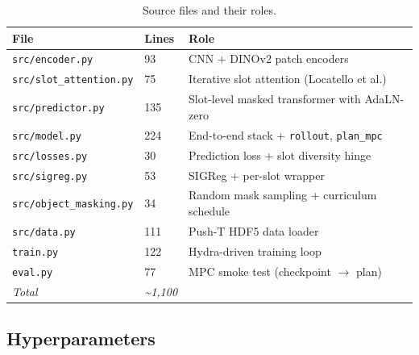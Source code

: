 \documentclass[12pt]{article}
\begin{document}
\begin{table}[h]
\centering
\caption{Source files and their roles.}
\begin{tabular}{@{}lll@{}}
\toprule
\textbf{File} & \textbf{Lines} & \textbf{Role} \\
\midrule
\texttt{src/encoder.py} & 93 & CNN + DINOv2 patch encoders \\
\texttt{src/slot\_attention.py} & 75 & Iterative slot attention (Locatello et al.) \\
\texttt{src/predictor.py} & 135 & Slot-level masked transformer with AdaLN-zero \\
\texttt{src/model.py} & 224 & End-to-end stack + \texttt{rollout}, \texttt{plan\_mpc} \\
\texttt{src/losses.py} & 30 & Prediction loss + slot diversity hinge \\
\texttt{src/sigreg.py} & 53 & SIGReg + per-slot wrapper \\
\texttt{src/object\_masking.py} & 34 & Random mask sampling + curriculum schedule \\
\texttt{src/data.py} & 111 & Push-T HDF5 data loader \\
\texttt{train.py} & 122 & Hydra-driven training loop \\
\texttt{eval.py} & 77 & MPC smoke test (checkpoint $\rightarrow$ plan) \\
\midrule
\textit{Total} & \textit{\textasciitilde 1,100} & \\
\bottomrule
\end{tabular}
\label{tab:files}
\end{table}

\subsection{Hyperparameters}
\end{document}
